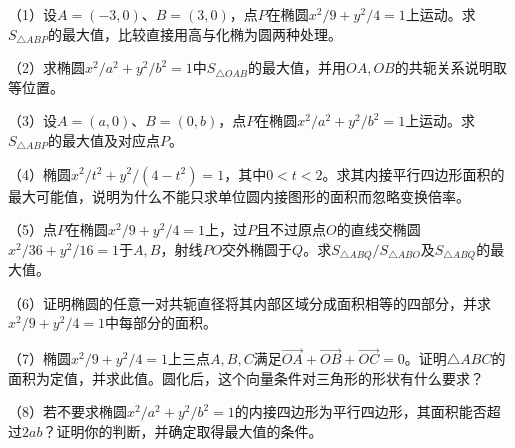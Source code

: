 \begin{exercise}
\mbox{}\par\nobreak

\begin{samepage}
（1）设\(A=(-3,0)\)、\(B=(3,0)\)，点\(P\)在椭圆\(x^2/9+y^2/4=1\)上运动。求\(S_{\triangle ABP}\)的最大值，比较直接用高与化椭为圆两种处理。
\par
\end{samepage}

\begin{samepage}
（2）求椭圆\(x^2/a^2+y^2/b^2=1\)中\(S_{\triangle OAB}\)的最大值，并用\(OA,OB\)的共轭关系说明取等位置。
\par
\end{samepage}

\begin{samepage}
（3）设\(A=(a,0)\)、\(B=(0,b)\)，点\(P\)在椭圆\(x^2/a^2+y^2/b^2=1\)上运动。求\(S_{\triangle ABP}\)的最大值及对应点\(P\)。
\par
\end{samepage}

\begin{samepage}
（4）椭圆\(x^2/t^2+y^2/(4-t^2)=1\)，其中\(0<t<2\)。求其内接平行四边形面积的最大可能值，说明为什么不能只求单位圆内接图形的面积而忽略变换倍率。
\par
\end{samepage}
\begin{samepage}
（5）点\(P\)在椭圆\(x^2/9+y^2/4=1\)上，过\(P\)且不过原点\(O\)的直线交椭圆\(x^2/36+y^2/16=1\)于\(A,B\)，射线\(PO\)交外椭圆于\(Q\)。求\(S_{\triangle ABQ}/S_{\triangle ABO}\)及\(S_{\triangle ABQ}\)的最大值。
\par
\end{samepage}

\begin{samepage}
（6）证明椭圆的任意一对共轭直径将其内部区域分成面积相等的四部分，并求\(x^2/9+y^2/4=1\)中每部分的面积。
\par
\end{samepage}

\begin{samepage}
（7）椭圆\(x^2/9+y^2/4=1\)上三点\(A,B,C\)满足\(\overrightarrow{OA}+\overrightarrow{OB}+\overrightarrow{OC}=0\)。证明\(\triangle ABC\)的面积为定值，并求此值。圆化后，这个向量条件对三角形的形状有什么要求？
\par
\end{samepage}

\begin{samepage}
（8）若不要求椭圆\(x^2/a^2+y^2/b^2=1\)的内接四边形为平行四边形，其面积能否超过\(2ab\)？证明你的判断，并确定取得最大值的条件。
\par
\end{samepage}
\end{exercise}

